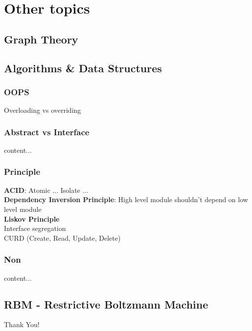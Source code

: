 \documentclass{beamer}
\begin{document}
\section{Other topics}
\subsection{Graph Theory}


\subsection{Algorithms \& Data Structures}
\begin{frame}\frametitle{OOPS}
	Overloading vs overriding
\end{frame}

\begin{frame}\frametitle{Abstract vs Interface}
	content...
\end{frame}

\begin{frame}\frametitle{Principle}
	\textbf{ACID}: Atomic ... Isolate ...\\
	\textbf{Dependency Inversion Principle}: High level module shouldn't depend on low level module\\
	\textbf{Liskov Principle}\\
	Interface segregation\\
	CURD (Create, Read, Update, Delete)\\
\end{frame}


\begin{frame}\frametitle{Non}
	content...
\end{frame}




\subsection{RBM - Restrictive Boltzmann Machine}






\begin{frame}
	Thank You!
\end{frame}
\end{document}
